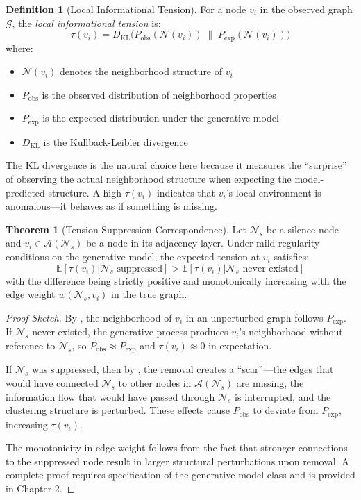 \documentclass[12pt,a4paper]{article}
\theoremstyle{definition}
\newtheorem{definition}{Definition}[section]
\newtheorem{theorem}{Theorem}[section]
\theoremstyle{remark}
\newcommand{\NS}{\mathcal{N}_s}          %
\newcommand{\CA}{\mathcal{A}}            %
\newcommand{\Dkl}{D_{\mathrm{KL}}}       %
\newcommand{\Expect}{\mathbb{E}}         %
\newcommand{\Graph}{\mathcal{G}}         %
\begin{document}
\begin{definition}[Local Informational Tension]
For a node $v_i$ in the observed graph $\Graph$, the \emph{local informational tension} is:
\begin{equation}
    \boxed{
    \tau(v_i) = \Dkl\Big( P_{\text{obs}}(\mathcal{N}(v_i)) \;\Big\|\; P_{\text{exp}}(\mathcal{N}(v_i)) \Big)
    }
    \label{eq:tension}
\end{equation}
where:
\begin{itemize}
    \item $\mathcal{N}(v_i)$ denotes the neighborhood structure of $v_i$
    \item $P_{\text{obs}}$ is the observed distribution of neighborhood properties
    \item $P_{\text{exp}}$ is the expected distribution under the generative model
    \item $\Dkl$ is the Kullback-Leibler divergence
\end{itemize}
\end{definition}

The KL divergence is the natural choice here because it measures the ``surprise'' of observing the actual neighborhood structure when expecting the model-predicted structure. A high $\tau(v_i)$ indicates that $v_i$'s local environment is anomalous—it behaves as if something is missing.

\begin{theorem}[Tension-Suppression Correspondence]
\label{thm:correspondence}
Let $\NS$ be a silence node and $v_i \in \CA(\NS)$ be a node in its adjacency layer. Under mild regularity conditions on the generative model, the expected tension at $v_i$ satisfies:
\begin{equation}
    \Expect[\tau(v_i) | \NS \text{ suppressed}] > \Expect[\tau(v_i) | \NS \text{ never existed}]
\end{equation}
with the difference being strictly positive and monotonically increasing with the edge weight $w(\NS, v_i)$ in the true graph.
\end{theorem}

\begin{proof}[Proof Sketch]
By , the neighborhood of $v_i$ in an unperturbed graph follows $P_{\text{exp}}$. If $\NS$ never existed, the generative process produces $v_i$'s neighborhood without reference to $\NS$, so $P_{\text{obs}} \approx P_{\text{exp}}$ and $\tau(v_i) \approx 0$ in expectation.

If $\NS$ was suppressed, then by , the removal creates a ``scar''—the edges that would have connected $\NS$ to other nodes in $\CA(\NS)$ are missing, the information flow that would have passed through $\NS$ is interrupted, and the clustering structure is perturbed. These effects cause $P_{\text{obs}}$ to deviate from $P_{\text{exp}}$, increasing $\tau(v_i)$.

The monotonicity in edge weight follows from the fact that stronger connections to the suppressed node result in larger structural perturbations upon removal. A complete proof requires specification of the generative model class and is provided in Chapter 2.
\end{proof}
\end{document}
